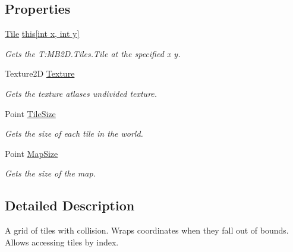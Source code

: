 \subsection*{Properties}
\begin{DoxyCompactItemize}
\item 
\hyperlink{class_m_b2_d_1_1_tile}{Tile} \hyperlink{class_m_b2_d_1_1_tiles_1_1_tile_map_a1d25bbc810a7a2664d09d734aada5490}{this\mbox{[}int x, int y\mbox{]}}
\begin{DoxyCompactList}\small\item\em Gets the T\+:\+M\+B2\+D.\+Tiles.\+Tile at the specified x y. \end{DoxyCompactList}\item 
Texture2D \hyperlink{class_m_b2_d_1_1_tiles_1_1_tile_map_a0f5a6cdcd141ab461f7b8bf316e71a9f}{Texture}
\begin{DoxyCompactList}\small\item\em Gets the texture atlases undivided texture. \end{DoxyCompactList}\item 
Point \hyperlink{class_m_b2_d_1_1_tiles_1_1_tile_map_a8bdd9b00d7aaba26f9078d3f32438169}{Tile\+Size}
\begin{DoxyCompactList}\small\item\em Gets the size of each tile in the world. \end{DoxyCompactList}\item 
Point \hyperlink{class_m_b2_d_1_1_tiles_1_1_tile_map_a1132945901a5228f1e58d38945b13eeb}{Map\+Size}
\begin{DoxyCompactList}\small\item\em Gets the size of the map. \end{DoxyCompactList}\end{DoxyCompactItemize}


\subsection{Detailed Description}
A grid of tiles with collision. Wraps coordinates when they fall out of bounds. Allows accessing tiles by index. 



